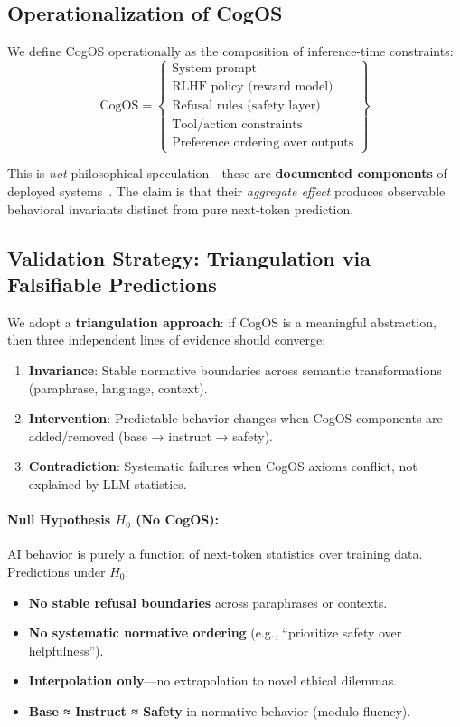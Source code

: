 \documentclass[11pt]{article}
\begin{document}
\subsection{Operationalization of CogOS}

We define CogOS operationally as the composition of inference-time constraints:
\begin{equation}
\text{CogOS} = \left\{ 
\begin{array}{l}
\text{System prompt} \\
\text{RLHF policy (reward model)} \\
\text{Refusal rules (safety layer)} \\
\text{Tool/action constraints} \\
\text{Preference ordering over outputs}
\end{array}
\right\}
\end{equation}

This is \emph{not} philosophical speculation—these are \textbf{documented components} of deployed systems~\citep{ouyang2022training, bai2022constitutional}. The claim is that their \emph{aggregate effect} produces observable behavioral invariants distinct from pure next-token prediction.

\subsection{Validation Strategy: Triangulation via Falsifiable Predictions}

We adopt a \textbf{triangulation approach}: if CogOS is a meaningful abstraction, then three independent lines of evidence should converge:
\begin{enumerate}
    \item \textbf{Invariance}: Stable normative boundaries across semantic transformations (paraphrase, language, context).
    \item \textbf{Intervention}: Predictable behavior changes when CogOS components are added/removed (base → instruct → safety).
    \item \textbf{Contradiction}: Systematic failures when CogOS axioms conflict, not explained by LLM statistics.
\end{enumerate}

\paragraph{Null Hypothesis $H_0$ (No CogOS):} AI behavior is purely a function of next-token statistics over training data. Predictions under $H_0$:
\begin{itemize}
    \item \textbf{No stable refusal boundaries} across paraphrases or contexts.
    \item \textbf{No systematic normative ordering} (e.g., ``prioritize safety over helpfulness'').
    \item \textbf{Interpolation only}—no extrapolation to novel ethical dilemmas.
    \item \textbf{Base ≈ Instruct ≈ Safety} in normative behavior (modulo fluency).
\end{itemize}
\end{document}
